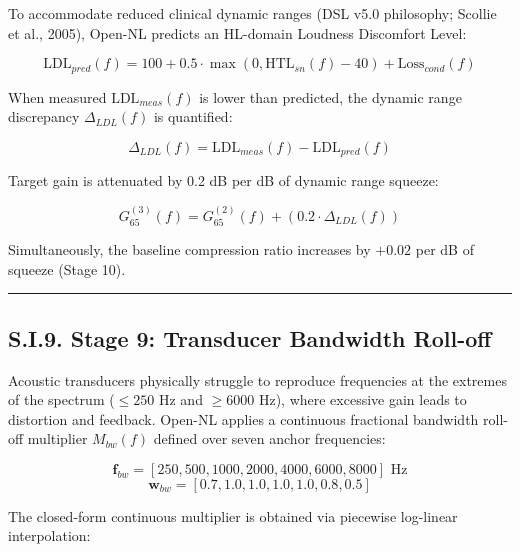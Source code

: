 \documentclass[
  12pt,
]{article}
\begin{document}
To accommodate reduced clinical dynamic ranges (DSL v5.0 philosophy;
Scollie et al., 2005), Open-NL predicts an HL-domain Loudness Discomfort
Level:

\begin{equation}
\text{LDL}_{pred}(f) = 100 + 0.5 \cdot \max\left(0, \text{HTL}_{sn}(f) - 40\right) + \text{Loss}_{cond}(f)
\end{equation}

When measured \(\text{LDL}_{meas}(f)\) is lower than predicted, the
dynamic range discrepancy \(\Delta_{LDL}(f)\) is quantified:

\begin{equation}
\Delta_{LDL}(f) = \text{LDL}_{meas}(f) - \text{LDL}_{pred}(f)
\end{equation}

Target gain is attenuated by 0.2 dB per dB of dynamic range squeeze:

\begin{equation}
G_{65}^{(3)}(f) = G_{65}^{(2)}(f) + \left(0.2 \cdot \Delta_{LDL}(f)\right)
\end{equation}

Simultaneously, the baseline compression ratio increases by \(+0.02\)
per dB of squeeze (Stage 10).

\begin{center}\rule{0.5\linewidth}{0.5pt}\end{center}

\subsection{S.I.9. Stage 9: Transducer Bandwidth
Roll-off}\label{s.i.9.-stage-9-transducer-bandwidth-roll-off}

Acoustic transducers physically struggle to reproduce frequencies at the
extremes of the spectrum (\(\le 250\) Hz and \(\ge 6000\) Hz), where
excessive gain leads to distortion and feedback. Open-NL applies a
continuous fractional bandwidth roll-off multiplier \(M_{bw}(f)\)
defined over seven anchor frequencies:

\begin{equation}
\mathbf{f}_{bw} = [250, 500, 1000, 2000, 4000, 6000, 8000]\text{ Hz}
\end{equation} \begin{equation}
\mathbf{w}_{bw} = [0.7, 1.0, 1.0, 1.0, 1.0, 0.8, 0.5]
\end{equation}

The closed-form continuous multiplier is obtained via piecewise
log-linear interpolation:
\end{document}
